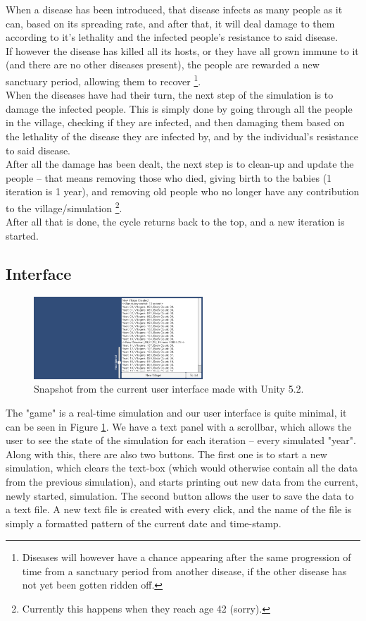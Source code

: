\documentclass[conference,compsoc]{IEEEtran}
\begin{document}
When a disease has been introduced, that disease infects as many people as it can, based on its spreading rate, and after that, it will deal damage to them according to it's lethality and the infected people's resistance to said disease.\\
If however the disease has killed all its hosts, or they have all grown immune to it (and there are no other diseases present), the people are rewarded a new sanctuary period, allowing them to recover \footnote{Diseases will however have a chance appearing after the same progression of time from a sanctuary period from another disease, if the other disease has not yet been gotten ridden off.}.\\
When the diseases have had their turn, the next step of the simulation is to damage the infected people. This is simply done by going through all the people in the village, checking if they are infected, and then damaging them based on the lethality of the disease they are infected by, and by the individual's resistance to said disease.\\
After all the damage has been dealt, the next step is to clean-up and update the people – that means removing those who died, giving birth to the babies (1 iteration is 1 year), and removing old people who no longer have any contribution to the village/simulation \footnote{Currently this happens when they reach age 42 (sorry).}.\\
After all that is done, the cycle returns back to the top, and a new iteration is started.\\

\subsection{Interface}
\begin{figure}[!t]
	\centering
	\graphicspath{{imgs/}}
	\includegraphics[width=2.5in]{GUI.png}
	\caption{Snapshot from the current user interface made with Unity 5.2.}
	\label{fig:gui}
\end{figure}
The "game" is a real-time simulation and our user interface is quite minimal, it can be seen in Figure \ref{fig:gui}. We have a text panel with a scrollbar, which allows the user to see the state of the simulation for each iteration – every simulated "year". Along with this, there are also two buttons. The first one is to start a new simulation, which clears the text-box (which would otherwise contain all the data from the previous simulation), and starts printing out new data from the current, newly started, simulation. The second button allows the user to save the data to a text file. A new text file is created with every click, and the name of the file is simply a formatted pattern of the current date and time-stamp.\\
\end{document}
